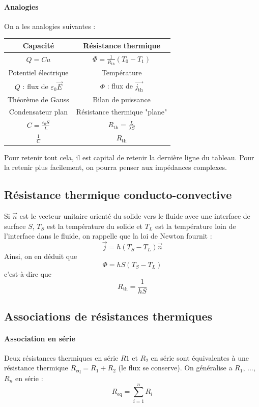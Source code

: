 \documentclass[french]{book}
\theoremstyle{plain}
\theoremstyle{definition}
\theoremstyle{remark}
\begin{document}
\paragraph{Analogies} On a les analogies suivantes : 
\begin{center}
	\begin{tabular}{|c|c|}
		\hline
		Capacité&Résistance thermique \\
		\hline
		$Q=Cu$&$\displaystyle\Phi=\frac{1}{R_\text{th}}(T_0-T_1)$ \\
		\hline
		Potentiel électrique&Température\\
		\hline
		$Q$ : flux de $\varepsilon_0\overrightarrow{E}$&$\Phi$ : flux de $\overrightarrow{j_\text{th}}$ \\
		\hline
		Théorème de Gauss & Bilan de puissance \\
		\hline
		Condensateur plan&Résistance thermique "plane" \\
		\hline
		$C=\displaystyle\frac{\varepsilon_0 S}{L}$&$\displaystyle R_\text{th}=\frac{L}{\lambda S}$\\
		\hline
		$\displaystyle\frac{1}{C}$&$R_\text{th}$\\
		\hline
	\end{tabular}
\end{center}
Pour retenir tout cela, il est capital de retenir la dernière ligne du tableau. Pour la retenir plus facilement, on pourra penser aux impédances complexes.
\subsection{Résistance thermique conducto-convective}
Si $\overrightarrow{n}$ est le vecteur unitaire orienté du solide vers le fluide avec une interface de surface $S$, $T_S$ est la température du solide et $T_L$ est la température loin de l'interface dans le fluide, on rappelle que la loi de Newton fournit : $$\overrightarrow{j}=h(T_S-T_L)\overrightarrow{n}$$ Ainsi, on en déduit que $$\Phi=hS(T_S-T_L)$$ c'est-à-dire que $$R_\text{th}=\frac{1}{hS}$$
\subsection{Associations de résistances thermiques}
\paragraph{Association en série} Deux résistances thermiques en série $R1$ et $R_2$ en série sont équivalentes à une résistance thermique $R_\text{eq}=R_1+R_2$ (le flux se conserve). On généralise a $R_1$, ..., $R_n$ en série : $$R_\text{eq}=\sum_{i=1}^{n}R_i$$
\end{document}

